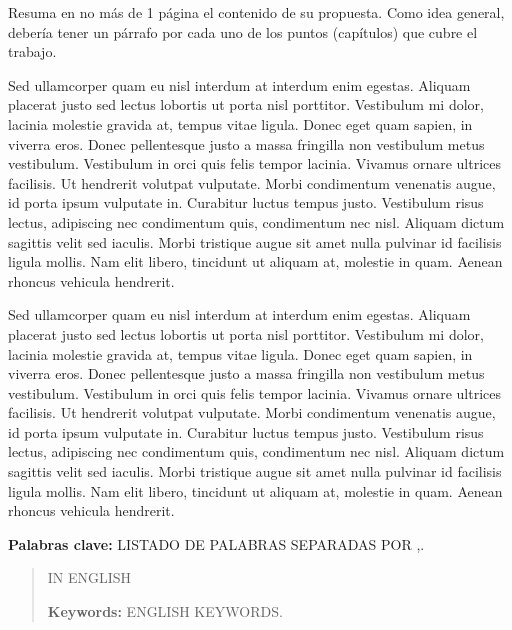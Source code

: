 \documentclass[
11pt, %
oneside, %
spanish, %
singlespacing, %
parskip, %
headsepline, %
table
]{MastersDoctoralThesis} %
\begin{document}
\begin{resumen}
\addchaptertocentry{\abstractname} %

Resuma en no más de 1 página el contenido de su propuesta. Como idea general, debería tener un párrafo por cada uno de los puntos (capítulos) que cubre el trabajo.

Sed ullamcorper quam eu nisl interdum at interdum enim egestas. Aliquam placerat justo sed lectus lobortis ut porta nisl porttitor. Vestibulum mi dolor, lacinia molestie gravida at, tempus vitae ligula. Donec eget quam sapien, in viverra eros. Donec pellentesque justo a massa fringilla non vestibulum metus vestibulum. Vestibulum in orci quis felis tempor lacinia. Vivamus ornare ultrices facilisis. Ut hendrerit volutpat vulputate. Morbi condimentum venenatis augue, id porta ipsum vulputate in. Curabitur luctus tempus justo. Vestibulum risus lectus, adipiscing nec condimentum quis, condimentum nec nisl. Aliquam dictum sagittis velit sed iaculis. Morbi tristique augue sit amet nulla pulvinar id facilisis ligula mollis. Nam elit libero, tincidunt ut aliquam at, molestie in quam. Aenean rhoncus vehicula hendrerit.

Sed ullamcorper quam eu nisl interdum at interdum enim egestas. Aliquam placerat justo sed lectus lobortis ut porta nisl porttitor. Vestibulum mi dolor, lacinia molestie gravida at, tempus vitae ligula. Donec eget quam sapien, in viverra eros. Donec pellentesque justo a massa fringilla non vestibulum metus vestibulum. Vestibulum in orci quis felis tempor lacinia. Vivamus ornare ultrices facilisis. Ut hendrerit volutpat vulputate. Morbi condimentum venenatis augue, id porta ipsum vulputate in. Curabitur luctus tempus justo. Vestibulum risus lectus, adipiscing nec condimentum quis, condimentum nec nisl. Aliquam dictum sagittis velit sed iaculis. Morbi tristique augue sit amet nulla pulvinar id facilisis ligula mollis. Nam elit libero, tincidunt ut aliquam at, molestie in quam. Aenean rhoncus vehicula hendrerit.

\textbf{Palabras clave:} LISTADO DE PALABRAS SEPARADAS POR ,.
\end{resumen}

\begin{abstract}

IN ENGLISH

\textbf{Keywords:} ENGLISH KEYWORDS.

\end{abstract}
\end{document}
